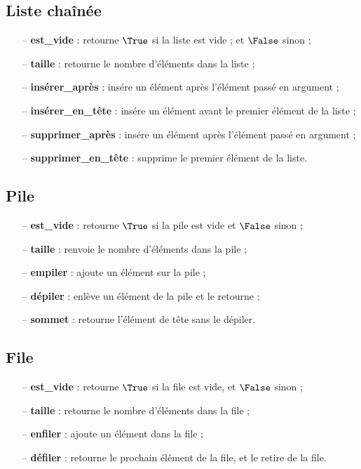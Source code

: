 


\subsection{Liste cha\^inée}

\begin{itemize}
\item[--] \textbf{est\_vide} : retourne $\True$ si la liste est vide ; et $\False$ sinon ;
\item[--] \textbf{taille} : retourne le nombre d'éléments dans la liste ;
\item[--] \textbf{insérer\_après} : insére un élément après l'élément passé en argument ;
\item[--] \textbf{insérer\_en\_tête} : insére un élément avant le premier élément de la liste ;
\item[--] \textbf{supprimer\_après} : insére un élément après l'élément passé en argument ;
\item[--] \textbf{supprimer\_en\_tête} : supprime le premier élément de la liste.
\end{itemize}



\subsection{Pile}

\begin{itemize}
\item[--] \textbf{est\_vide} : retourne $\True$ si la pile est vide et $\False$ sinon ;
\item[--] \textbf{taille} : renvoie le nombre d'éléments dans la pile ;
\item[--] \textbf{empiler} : ajoute un élément sur la pile ;
\item[--] \textbf{dépiler} : enlève un élément de la pile et le retourne ;
\item[--] \textbf{sommet} : retourne l'élément de tête sans le dépiler.
\end{itemize}



\subsection{File}
\begin{itemize}
\item[--] \textbf{est\_vide} : retourne $\True$ si la file est vide, et $\False$ sinon ;
\item[--] \textbf{taille} : retourne le nombre d'éléments dans la file ;
\item[--] \textbf{enfiler} : ajoute un élément dans la file ;
\item[--] \textbf{défiler} : retourne le prochain élément de la file, et le retire de la file.
\end{itemize}
